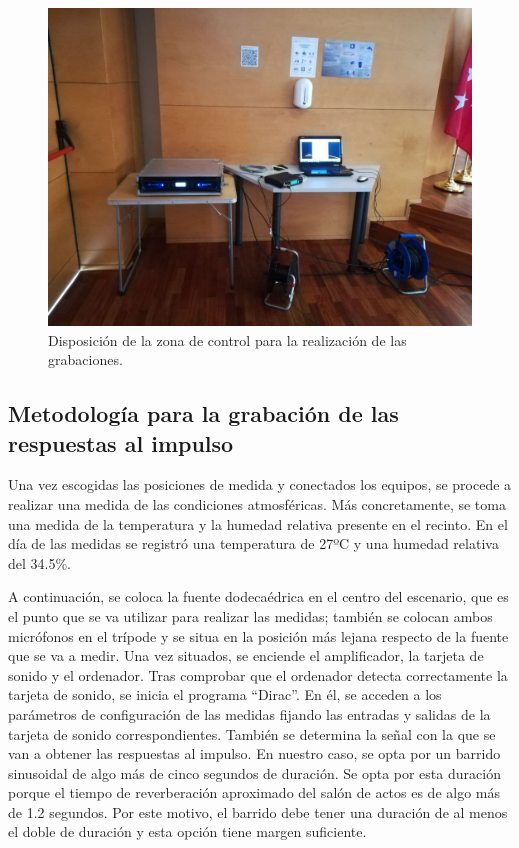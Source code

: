 \documentclass[11pt,a4paper,twoside]{book}
\begin{document}
	        \begin{figure}
	            \includegraphics[scale=0.4]{../imagenes/control.jpg}
			    \centering
			    \caption{Disposición de la zona de control para la realización de las grabaciones.}
			    \label{fig:control}
	        \end{figure}
	    
        \subsection{Metodología para la grabación de las respuestas al impulso}
            Una vez escogidas las posiciones de medida y conectados los equipos, se procede a realizar una medida de las condiciones atmosféricas. Más concretamente, se toma una medida de la temperatura y la humedad relativa presente en el recinto. En el día de las medidas se registró una temperatura de 27ºC y una humedad relativa del 34.5\%.
        
            A continuación, se coloca la fuente dodecaédrica en el centro del escenario, que es el punto que se va utilizar para realizar las medidas; también se colocan ambos micrófonos en el trípode y se situa en la posición más lejana respecto de la fuente que se va a medir. Una vez situados, se enciende el amplificador, la tarjeta de sonido y el ordenador. Tras comprobar que el ordenador detecta correctamente la tarjeta de sonido, se inicia el programa ``Dirac''. En él, se acceden a los parámetros de configuración de las medidas fijando las entradas y salidas de la tarjeta de sonido correspondientes. También se determina la señal con la que se van a obtener las respuestas al impulso. En nuestro caso, se opta por un barrido sinusoidal de algo más de cinco segundos de duración. Se opta por esta duración porque el tiempo de reverberación aproximado del salón de actos es de algo más de 1.2 segundos. Por este motivo, el barrido debe tener una duración de al menos el doble de duración y esta opción tiene margen suficiente.
        
\end{document}
